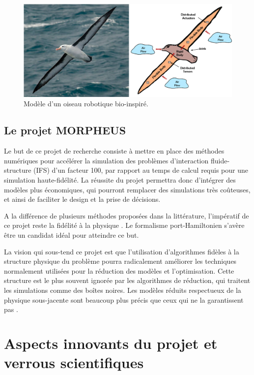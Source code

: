 \documentclass[french]{article}
\begin{document}
\begin{figure}[tb]
	\centering
	\includegraphics[width = .7\textwidth]{Bird_Port_Hamiltonian_Subsystems_FULL_ARC.eps}
	\caption{Modèle d'un oiseau robotique bio-inspiré.}
	\label{fig:pH_view_bird}
\end{figure}

\subsection{Le projet MORPHEUS}
Le but de ce projet de recherche consiste à mettre en place des méthodes numériques
pour accélérer la simulation des problèmes d'interaction fluide-structure (IFS)  d’un facteur 100, par rapport au temps de calcul requis pour une simulation haute-fidélité. La réussite du projet permettra donc d’intégrer des modèles plus économiques, qui pourront remplacer des simulations très coûteuses, et ainsi de faciliter le design et la prise de décisions.

A la différence de plusieurs méthodes proposées dans la littérature, l'impératif de ce projet reste la fidélité à la physique \cite{willcox2021}. Le formalisme port-Hamiltonien s'avère être un candidat idéal pour atteindre ce but.

La vision qui sous-tend ce projet est que l’utilisation d’algorithmes fidèles à la structure physique du problème pourra radicalement améliorer les techniques normalement utilisées pour la réduction des modèles et l’optimisation. Cette structure est le plus souvent ignorée par les algorithmes de réduction, qui traitent les simulations comme des boîtes noires. Les modèles réduits respectueux de la physique sous-jacente sont beaucoup plus précis que ceux qui ne la garantissent pas \cite{lee2020}. 


\section{Aspects innovants du projet et verrous scientifiques}
\end{document}
